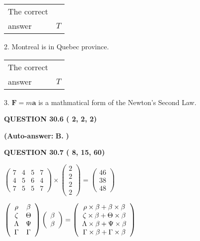 \documentclass[12pt]{article}
\begin{document}
\noindent\begin{tabular}{|l|l|}\hline The correct & \\
          answer &  %
$T$ \\ \hline \end{tabular}
2.  %
Montreal is in  %
Quebec province.
 
\noindent\begin{tabular}{|l|l|}\hline The correct & \\
          answer &  %
$T$ \\ \hline \end{tabular}
3.  %
$\mathbf{F}=m\mathbf{a}$ is a mathmatical form of  %
the Newton's Second Law.
 
  
  
{\textbf{\large{QUESTION
30.6 
 (          2,          2,          2)
}}}
 
 
{\textbf{(Auto-answer:}}
{\textbf{\large{
B.}}}
{\textbf{)}}
 
 
  
  
{\textbf{\large{QUESTION
30.7 
 (          8,         15,         60)
}}}

 
$\left( \begin{array}{ccccccccccccccc}
           7 & 
           4 & 
           5 & 
           7 \\ 
           4 & 
           5 & 
           6 & 
           4 \\ 
           7 & 
           5 & 
           5 & 
           7
\end{array}\right) \times
\left( \begin{array}{c}
           2 \\ 
           2 \\ 
           2 \\ 
           2
\end{array}\right)  =
\left( \begin{array}{c}
          46 \\ 
          38 \\ 
          48
\end{array}\right)  $
 
$  %
 \left( \begin{array}
 {
 c
 c
 }
 \rho & 
 \beta \\ 
                    \zeta & 
 \Theta \\ 
 \Lambda & 
 \Psi \\ 
 \Gamma & 
 \Gamma
 \end{array} \right)
 \left( \begin{array}
 {
 c
 }
 \beta \\ 
 \beta
 \end{array} \right)
=
  \left( \begin{array}
 {
 c
 }
 \rho \times  \beta   +  \beta \times  \beta \\ 
                    \zeta \times  \beta   +  \Theta \times  \beta \\ 
 \Lambda \times  \beta   +  \Psi \times  \beta \\ 
 \Gamma \times  \beta   +  \Gamma \times  \beta
 \end{array} \right)
$
 
\end{document}

